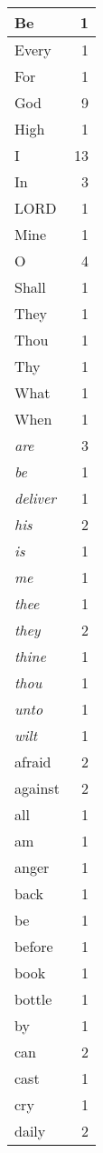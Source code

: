 \begin{center}
\begin{longtable}{l|r}
\hline \hline
\endlastfoot
Be & 1 \\ \hline
Every & 1 \\ \hline
For & 1 \\ \hline
God & 9 \\ \hline
High & 1 \\ \hline
I & 13 \\ \hline
In & 3 \\ \hline
LORD & 1 \\ \hline
Mine & 1 \\ \hline
O & 4 \\ \hline
Shall & 1 \\ \hline
They & 1 \\ \hline
Thou & 1 \\ \hline
Thy & 1 \\ \hline
What & 1 \\ \hline
When & 1 \\ \hline
\emph{are} & 3 \\ \hline
\emph{be} & 1 \\ \hline
\emph{deliver} & 1 \\ \hline
\emph{his} & 2 \\ \hline
\emph{is} & 1 \\ \hline
\emph{me} & 1 \\ \hline
\emph{thee} & 1 \\ \hline
\emph{they} & 2 \\ \hline
\emph{thine} & 1 \\ \hline
\emph{thou} & 1 \\ \hline
\emph{unto} & 1 \\ \hline
\emph{wilt} & 1 \\ \hline
afraid & 2 \\ \hline
against & 2 \\ \hline
all & 1 \\ \hline
am & 1 \\ \hline
anger & 1 \\ \hline
back & 1 \\ \hline
be & 1 \\ \hline
before & 1 \\ \hline
book & 1 \\ \hline
bottle & 1 \\ \hline
by & 1 \\ \hline
can & 2 \\ \hline
cast & 1 \\ \hline
cry & 1 \\ \hline
daily & 2 \\ \hline

\end{longtable}
\end{center}
